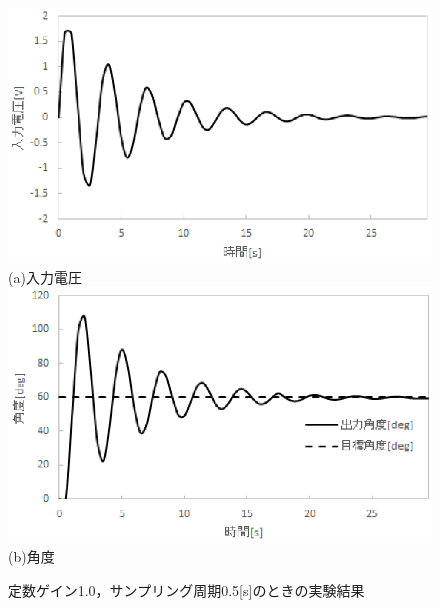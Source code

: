 \documentclass[11pt,a4paper]{jsarticle}
\begin{document}
\begin{figure}[H]
 \begin{center}
  \includegraphics[scale=.6]{./picture/regraph5.eps} \\
  (a)入力電圧 \\
  \includegraphics[scale=.6]{./picture/regraph6.eps} \\
  (b)角度
  \caption{定数ゲイン1.0，サンプリング周期0.5[s]のときの実験結果}
 \end{center}
\end{figure}
\end{document}

